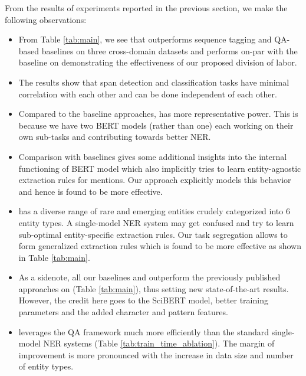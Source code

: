 From the results of experiments reported in the previous section, we make the following observations:

\begin{itemize}
    \item From Table \ref{tab:main}, we see that \modelname{} outperforms sequence tagging and QA-based baselines on three cross-domain datasets and performs on-par with the baseline on  demonstrating the effectiveness of our proposed division of labor. 
    
    \item The results show that span detection and classification tasks have minimal correlation with each other and can be done independent of each other. 
    
    \item Compared to the baseline approaches, \modelname{} has more representative power. This is because we have two BERT models (rather than one) each working on their own sub-tasks and contributing towards better NER. %
    
    \item Comparison with baselines gives some additional insights into the internal functioning of BERT model which also implicitly tries to learn entity-agnostic extraction rules for mentions. Our approach explicitly models this behavior and hence is found to be more effective.
    
    \item {} has a diverse range of rare and emerging entities crudely categorized into $6$ entity types. A single-model NER system may get confused and try to learn sub-optimal entity-specific extraction rules. Our task segregation allows \spandetect{} to form generalized extraction rules which is found to be more effective as shown in Table \ref{tab:main}.
    
    \item As a sidenote, all our baselines and \modelname{} outperform the previously published approaches on  (Table \ref{tab:main}), thus setting new state-of-the-art results. However, the credit here goes to the SciBERT model, 
    better training parameters and the added character and pattern features.
    
    \item \modelname{} leverages the QA framework much more efficiently than the standard single-model NER systems (Table \ref{tab:train_time_ablation}). The margin of improvement is more pronounced with the increase in data size and number of entity types.
    

\end{itemize}
